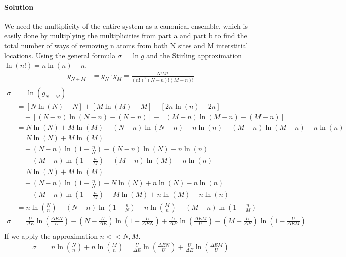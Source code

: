 \documentclass{article}
\begin{document}
\begin{enumerate}
		\paragraph{Solution} We need the multiplicity of the entire system as a canonical ensemble, which is easily done by multiplying the multiplicities from part a and part b to find the total number of ways of removing n atoms from both N sites and M interstitial locations. Using the general formula $\sigma = \ln g$ and the Stirling approximation $ \ln(n!) = n\ln(n) - n $.
		\begin{align*}
			g_{N+M} &= g_N \cdot g_M = \frac{N! M!}{(n!)^2(N-n)!(M-n)!}
		\end{align*}
		\begin{align*}
			\sigma &= \ln(g_{N+M}) \\
			&= \left[N\ln(N) - N\right] + \left[M\ln(M) - M\right] - \left[2n\ln(n) - 2n\right] \\
			&\quad- \left[(N-n)\ln(N-n) - (N-n)\right] - \left[(M-n)\ln(M-n) - (M-n)\right] \\
			&= N\ln(N) + M\ln(M) - (N-n)\ln(N-n) - n\ln(n) - (M-n)\ln(M-n) - n\ln(n) \\
			&= N\ln(N) + M\ln(M) \\
			&\quad- (N-n)\ln(1 - \frac{n}{N}) - (N-n)\ln(N) - n\ln(n) \\
			&\quad- (M-n)\ln(1 - \frac{n}{M}) - (M-n)\ln(M) - n\ln(n) \\
			&= N\ln(N) + M\ln(M) \\
			&\quad- (N-n)\ln(1 - \frac{n}{N}) - N\ln(N) + n\ln(N) - n\ln(n) \\
			&\quad- (M-n)\ln(1 - \frac{n}{M}) - M\ln(M) + n\ln(M) - n\ln(n) \\
			&= n\ln(\frac{N}{n}) - (N-n)\ln(1 - \frac{n}{N}) + n\ln(\frac{M}{n}) - (M-n)\ln(1 - \frac{n}{M}) \\
			\sigma &= \frac{U}{\Delta E} \ln(\frac{\Delta E N}{U}) - (N-\frac{U}{\Delta E})\ln(1 - \frac{U}{\Delta E N}) + \frac{U}{\Delta E}\ln(\frac{\Delta E M}{U}) - (M-\frac{U}{\Delta E})\ln(1 - \frac{U}{\Delta E M}) \\
		\end{align*}
		If we apply the approximation $n << N,M$.
		\begin{align*}
			\sigma &= n\ln(\frac{N}{n}) + n\ln(\frac{M}{n}) = \frac{U}{\Delta E}\ln(\frac{\Delta E N}{U}) + \frac{U}{\Delta E} \ln(\frac{\Delta E M}{U}) \\
		\end{align*}
		

\end{enumerate}
\end{document}
